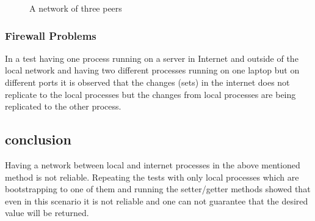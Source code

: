 \begin{figure}
\centering
{}
\caption{A network of three peers}
\label{fig:threepeers}
\end{figure}


\subsubsection{Firewall Problems}
In a test having one process running on a server in Internet and outside of the local network and having two different processes running on one laptop but on different ports it is observed that the changes (sets) in the internet does not replicate to the local processes but the changes from local processes are being replicated to the other process.

\subsection{conclusion}
Having a network between local and internet processes in the above mentioned method is not reliable. Repeating the tests with only local processes which are bootstrapping to one of them and running the setter/getter methods showed that even in this scenario it is not reliable and one can not guarantee that the desired value will be returned.


